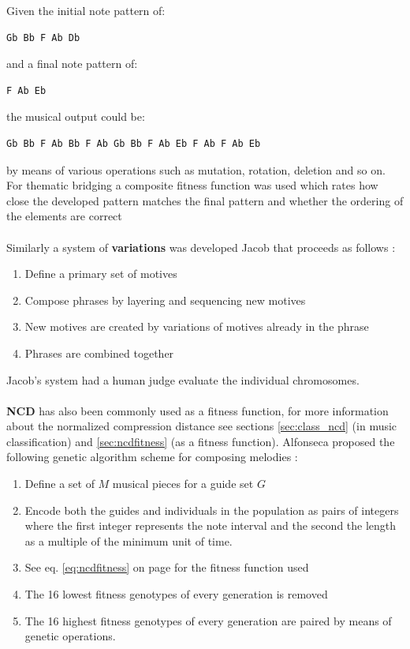 Given the initial note pattern of:
 \begin{verbatim}Gb Bb F Ab Db \end{verbatim}
and a final note pattern of:
\begin{verbatim}F Ab Eb \end{verbatim}
the musical output could be:
\begin{verbatim}Gb Bb F Ab Bb F Ab Gb Bb F Ab Eb F Ab F Ab Eb \end{verbatim} by means of various operations such as mutation, rotation, deletion and so on.
For thematic bridging a composite fitness function was used which rates how close the developed pattern matches the final pattern and whether the ordering of the elements are correct 
\\
\\
Similarly a system of \textbf{variations} was developed Jacob that proceeds as follows \cite{Jacob1995}:
\begin{enumerate}
\item Define a primary set of motives
\item Compose phrases by layering and sequencing new motives
\item New motives are created by variations of motives already in the phrase
\item Phrases are combined together
\end{enumerate}
Jacob's system had a human judge evaluate the individual chromosomes. 
\\
\\
\textbf{\ac{NCD}} has also been commonly used as a fitness function, for more information about the normalized compression distance see sections \ref{sec:class_ncd} (in music classification) and \ref{sec:ncdfitness} (as a fitness function).
Alfonseca proposed the following genetic algorithm scheme for composing melodies \cite{Alfonseca2007}:
\begin{enumerate}
\item Define a set of $M$ musical pieces for a guide set $G$
\item Encode both the guides and individuals in the population as pairs of integers where the first integer represents the note interval and the second the length as a multiple of the minimum unit of time.
\item See eq. \ref{eq:ncdfitness} on page \pageref{eq:ncdfitness} for the fitness function used
\item The 16 lowest fitness genotypes of every generation is removed
\item The 16 highest fitness genotypes of every generation are paired by means of genetic operations.
\end{enumerate}


